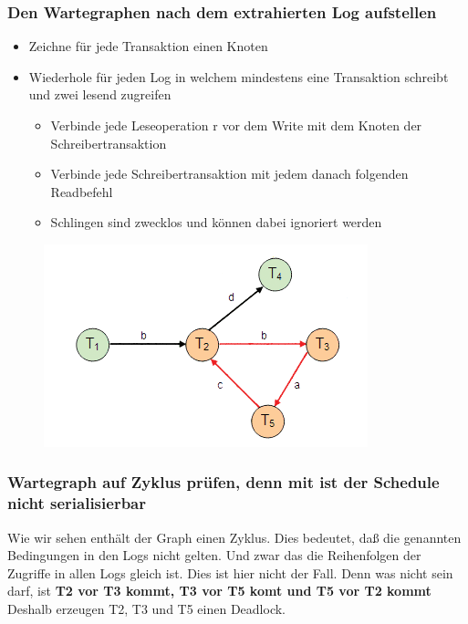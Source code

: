 \subsubsection*{Den Wartegraphen nach dem extrahierten Log aufstellen}
\begin{itemize}
    \item Zeichne für jede Transaktion einen Knoten
    \item Wiederhole für jeden Log in welchem mindestens eine Transaktion schreibt und zwei lesend zugreifen
    \begin{itemize}
        \item Verbinde jede Leseoperation r vor dem Write mit dem Knoten der Schreibertransaktion
        \item Verbinde jede Schreibertransaktion mit jedem danach folgenden Readbefehl
        \item Schlingen sind zwecklos und können dabei ignoriert werden
    \end{itemize}
\end{itemize}
\begin{figure}[H]
\centering
    \includegraphics[scale=1.0]{Content/images/gleichzeitigkeit/example3.png}
\end{figure}
\subsubsection*{Wartegraph auf Zyklus prüfen, denn mit ist der Schedule nicht serialisierbar}
Wie wir sehen enthält der Graph einen Zyklus. Dies bedeutet, daß die genannten Bedingungen in den Logs nicht gelten. Und zwar das die Reihenfolgen der Zugriffe in allen Logs gleich ist. Dies ist hier nicht der Fall. Denn was nicht sein darf, ist
\newline
\textbf{T2 vor T3 kommt, T3 vor T5 komt und T5 vor T2 kommt}
\newline
Deshalb erzeugen T2, T3 und T5 einen Deadlock.
